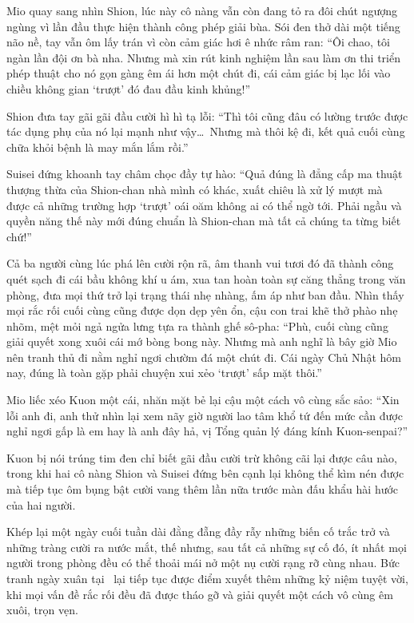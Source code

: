 \documentclass[../main.tex]{subfiles}
\begin{document}
Mio quay sang nhìn Shion, lúc này cô nàng vẫn còn đang tỏ ra đôi chút ngượng ngùng vì lần đầu thực hiện thành công phép giải bùa. Sói đen thở dài một tiếng não nề, tay vẫn ôm lấy trán vì còn cảm giác hơi ê nhức râm ran: ``Ôi chao, tôi ngàn lần đội ơn bà nha. Nhưng mà xin rút kinh nghiệm lần sau làm ơn thi triển phép thuật cho nó gọn gàng êm ái hơn một chút đi, cái cảm giác bị lạc lối vào chiều không gian `trượt' đó đau đầu kinh khủng!''

Shion đưa tay gãi gãi đầu cười hì hì tạ lỗi: ``Thì tôi cũng đâu có lường trước được tác dụng phụ của nó lại mạnh như vậy\dots\ Nhưng mà thôi kệ đi, kết quả cuối cùng chữa khỏi bệnh là may mắn lắm rồi.''

Suisei đứng khoanh tay châm chọc đầy tự hào: ``Quả đúng là đẳng cấp ma thuật thượng thừa của Shion-chan nhà mình có khác, xuất chiêu là xử lý mượt mà được cả những trường hợp `trượt' oái oăm không ai có thể ngờ tới. Phải ngầu và quyền năng thế này mới đúng chuẩn là Shion-chan mà tất cả chúng ta từng biết chứ!''

Cả ba người cùng lúc phá lên cười rộn rã, âm thanh vui tươi đó đã thành công quét sạch đi cái bầu không khí u ám, xua tan hoàn toàn sự căng thẳng trong văn phòng, đưa mọi thứ trở lại trạng thái nhẹ nhàng, ấm áp như ban đầu. Nhìn thấy mọi rắc rối cuối cùng cũng được dọn dẹp yên ổn, cậu con trai khẽ thở phào nhẹ nhõm, mệt mỏi ngả ngửa lưng tựa ra thành ghế sô-pha: ``Phù, cuối cùng cũng giải quyết xong xuôi cái mớ bòng bong này. Nhưng mà anh nghĩ là bây giờ Mio nên tranh thủ đi nằm nghỉ ngơi chườm đá một chút đi. Cái ngày Chủ Nhật hôm nay, đúng là toàn gặp phải chuyện xui xẻo `trượt' sấp mặt thôi.''

Mio liếc xéo Kuon một cái, nhăn mặt bẻ lại cậu một cách vô cùng sắc sảo: ``Xin lỗi anh đi, anh thử nhìn lại xem nãy giờ người lao tâm khổ tứ đến mức cần được nghỉ ngơi gấp là em hay là anh đây hả, vị Tổng quản lý đáng kính Kuon-senpai?''

Kuon bị nói trúng tim đen chỉ biết gãi đầu cười trừ không cãi lại được câu nào, trong khi hai cô nàng Shion và Suisei đứng bên cạnh lại không thể kìm nén được mà tiếp tục ôm bụng bật cười vang thêm lần nữa trước màn đấu khẩu hài hước của hai người.

Khép lại một ngày cuối tuần dài đằng đẵng đầy rẫy những biến cố trắc trở và những tràng cười ra nước mắt, thế nhưng, sau tất cả những sự cố đó, ít nhất mọi người trong phòng đều có thể thoải mái nở một nụ cười rạng rỡ cùng nhau. Bức tranh ngày xuân tại \hll\ lại tiếp tục được điểm xuyết thêm những kỷ niệm tuyệt vời, khi mọi vấn đề rắc rối đều đã được tháo gỡ và giải quyết một cách vô cùng êm xuôi, trọn vẹn.
\end{document}
